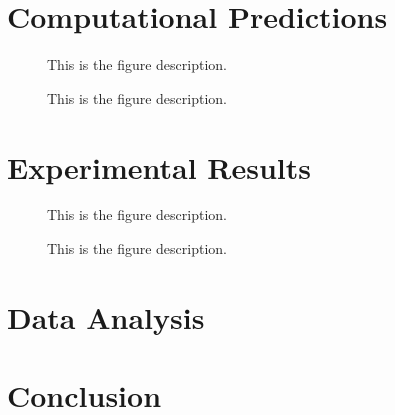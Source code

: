 \documentclass[oneside, astronomy, noacknowlegments]{BYUPhys}
\begin{document}
\section{Computational Predictions}

\begin{figure}
    \caption[ODMR computational model for SiC]{\label{fig:SiCModel}
     This is the figure description.}
 \end{figure}

\begin{figure}
    \caption[ODMR computational model for CdTe]{\label{fig:CdTeModel}
     This is the figure description.}
 \end{figure}

\section{Experimental Results}

\begin{figure}
    \caption[Experimental ODMR for SiC]{\label{fig:SiCResults}
     This is the figure description.}
 \end{figure}

\begin{figure}
    \caption[Experimental ODMR for CdTe]{\label{fig:CdTeResults}
     This is the figure description.}
 \end{figure}


\section{Data Analysis}

\section{Conclusion}
\end{document}
